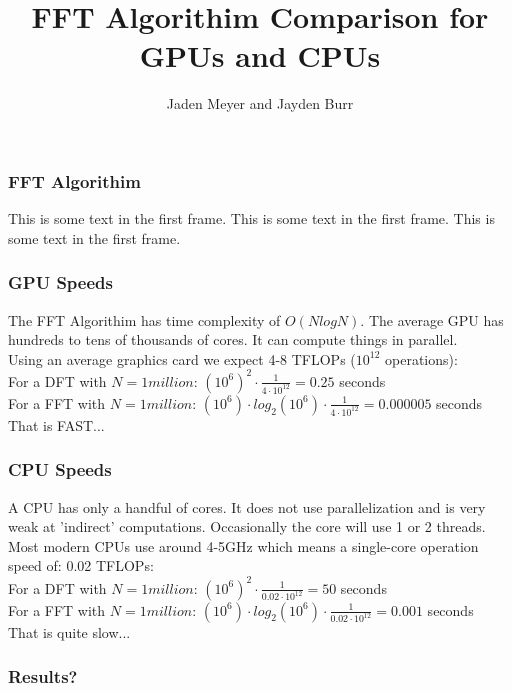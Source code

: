 \documentclass{beamer}
\title{FFT Algorithim Comparison for GPUs and CPUs}
\author{Jaden Meyer and Jayden Burr}
\begin{document}
\frame{\titlepage}

\begin{frame}
\frametitle{FFT Algorithim}
This is some text in the first frame. This is some text in the first frame. This is some text in the first frame.
\end{frame}

\begin{frame}
\frametitle{GPU Speeds}
The FFT Algorithim has time complexity of $O(NlogN)$. The average GPU has hundreds to tens of thousands of cores. It can compute things in parallel.\\
\vspace{1mm}
Using an average graphics card we expect 4-8 TFLOPs ($10^{12}$ operations):\\
\vspace{1mm}
\pause
For a DFT with $N = 1 million$: $ (10^6)^2 \cdot \frac{1}{4\cdot10^{12}} = 0.25$ seconds\\
\pause
For a FFT with $N= 1 million$: $ (10^6) \cdot log_2(10^6) \cdot \frac{1}{4\cdot10^{12}} = 0.000005$ seconds\\
\pause
\vspace{1mm}
That is FAST...

\end{frame}

\begin{frame}
    \frametitle{CPU Speeds}
    A CPU has only a handful of cores. It does not use parallelization and is very weak at 'indirect' computations. Occasionally the core will use 1 or 2 threads.\\
    \vspace{1mm}
    \pause
    Most modern CPUs use around 4-5GHz which means a single-core operation speed of: 0.02 TFLOPs:\\
    For a DFT with $N = 1 million$: $ (10^6)^2 \cdot \frac{1}{0.02\cdot10^{12}} = 50$ seconds\\
    \pause
    For a FFT with $N= 1 million$: $ (10^6) \cdot log_2(10^6) \cdot \frac{1}{0.02\cdot10^{12}} = 0.001$ seconds\\
    \pause
    \vspace{1mm}
    That is quite slow...
\end{frame}

\begin{frame}
    \frametitle{Results?}
    
\end{frame}
\end{document}
